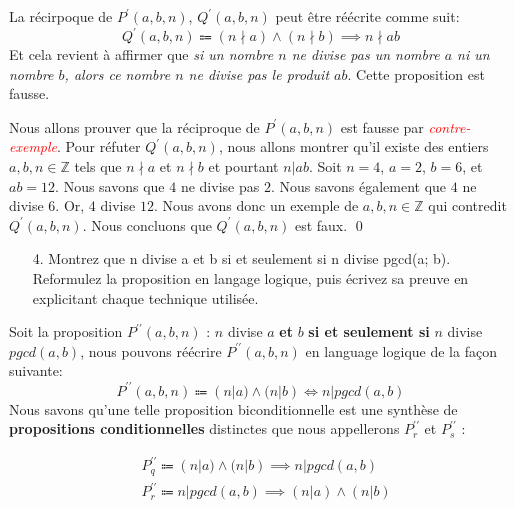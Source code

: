 \documentclass[16pt]{report}
\begin{document}
\begin{multicols*}{2}
    La récirpoque de $P^{\prime}(a,b, n)$, $Q^{\prime}(a,b, n)$ peut être réécrite comme suit: 
    \[  Q^{\prime}(a,b, n) \Coloneqq (n \nmid a) \land (n \nmid b)  \implies  n \nmid ab \]
    Et cela revient à affirmer que \textit{ si un nombre \textcolor{myb}{$n$} ne divise   
        pas un nombre \textcolor{myb}{$a$} ni un nombre \textcolor{myb}{$b$}, alors ce nombre
    \textcolor{myb}{$n$} ne divise pas le produit \textcolor{myb}{$ab$}}. Cette proposition est fausse.   

    \begin{Preuve*}{}{}
        Nous allons prouver que la réciproque de $P^{\prime}(a,b,n)$ est fausse par 
        \textcolor{red}{\textit{contre-exemple}}. 
        Pour réfuter $Q^{\prime}(a,b,n)$, nous allons montrer qu'il existe des entiers 
        $a, b, n \in \mathbb{Z}$ tels que $n \nmid a$ et $n \nmid b$ et pourtant $n | ab$. 
        Soit $n = 4$, $a = 2$, $b = 6$, et $ab = 12$. Nous savons que 
        $4$ ne divise pas $2$. Nous savons également que $4$ ne divise $6$. Or, $4$ divise 
        $12$. Nous avons donc un exemple de $a, b, n \in \mathbb{Z}$ qui contredit $Q^{\prime}(a,b,n)$. 
        Nous concluons que $Q^{\prime}(a,b,n)$ est faux. \qed
    \end{Preuve*}

    \begin{enumerate}
        \item[4.] Montrez que n divise a et b si et seulement si n divise pgcd(a; b). Reformulez
        la proposition en langage logique, puis écrivez sa preuve en explicitant chaque
        technique utilisée.
    \end{enumerate}

    Soit la proposition $P^{\prime\prime}(a,b,n)$ : $n$ divise $a$ \textbf{et} $b$  
    \textbf{si et seulement si}  $n$ divise $pgcd(a,b)$, nous pouvons réécrire $P^{\prime\prime}(a,b,n)$ 
    en language logique de la façon suivante: 
    \[ P^{\prime\prime}(a,b,n)  \Coloneqq (n|a) \land (n|b)  \Leftrightarrow n|pgcd(a,b) \]
    Nous savons qu'une telle proposition biconditionnelle est une synthèse de \textbf{propositions conditionnelles}
    distinctes que nous appellerons $P^{\prime\prime}_r$ et $P^{\prime\prime}_s$ :


    \begin{align}
              &P^{\prime\prime}_q \Coloneqq (n|a) \land (n|b) \implies  n|pgcd(a,b) \\ 
              &P^{\prime\prime}_r \Coloneqq n|pgcd(a,b) \implies (n|a) \land (n|b)
    \end{align}  

\end{multicols*}
\end{document}
